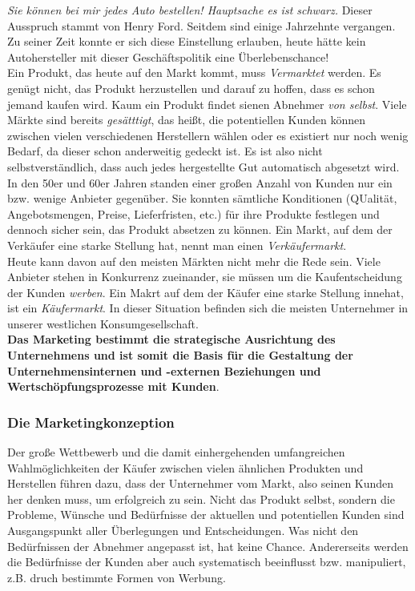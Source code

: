 \documentclass[a4paper, 12pt]{report}
\begin{document}
\begin{multicols}{2}
\emph{Sie können bei mir jedes Auto bestellen! Hauptsache es ist schwarz.}
Dieser Ausspruch stammt von Henry Ford. Seitdem sind einige Jahrzehnte
vergangen. Zu seiner Zeit konnte er sich diese Einstellung erlauben, heute
hätte kein Autohersteller mit dieser Geschäftspolitik eine Überlebenschance! \\

Ein Produkt, das heute auf den Markt kommt, muss \emph{Vermarktet} werden. Es
genügt nicht, das Produkt herzustellen und darauf zu hoffen, dass es schon
jemand kaufen wird. Kaum ein Produkt findet sienen Abnehmer \emph{von selbst}.
Viele Märkte sind bereits \emph{gesätttigt}, das heißt, die potentiellen Kunden
können zwischen vielen verschiedenen Herstellern wählen oder es existiert nur
noch wenig Bedarf, da dieser schon anderweitig gedeckt ist. Es ist also nicht
selbstverständlich, dass auch jedes hergestellte Gut automatisch abgesetzt
wird. \\

In den 50er und 60er Jahren standen einer großen Anzahl von Kunden nur ein bzw.
wenige Anbieter gegenüber. Sie konnten sämtliche Konditionen (QUalität,
Angebotsmengen, Preise, Lieferfristen, etc.) für ihre Produkte festlegen und
dennoch sicher sein, das Produkt absetzen zu können. Ein Markt, auf dem der
Verkäufer eine starke Stellung hat, nennt man einen \emph{Verkäufermarkt}. \\

Heute kann davon auf den meisten Märkten nicht mehr die Rede sein. Viele
Anbieter stehen in Konkurrenz zueinander, sie müssen um die Kaufentscheidung der
Kunden \emph{werben}. Ein Makrt auf dem der Käufer eine starke Stellung innehat,
ist ein \emph{Käufermarkt}. In dieser Situation befinden sich die meisten
Unternehmer in unserer westlichen Konsumgesellschaft. \\

\textbf{Das Marketing bestimmt die strategische Ausrichtung des Unternehmens und
ist somit die Basis für die Gestaltung der Unternehmensinternen und -externen
Beziehungen und Wertschöpfungsprozesse mit Kunden}. \\

\subsubsection{Die Marketingkonzeption}

Der große Wettbewerb und die damit einhergehenden umfangreichen
Wahlmöglichkeiten der Käufer zwischen vielen ähnlichen Produkten und Herstellen
führen dazu, dass der Unternehmer vom Markt, also seinen Kunden her denken muss,
um erfolgreich zu sein. Nicht das Produkt selbst, sondern die Probleme, Wünsche
und Bedürfnisse der aktuellen und potentiellen Kunden sind Ausgangspunkt aller
Überlegungen und Entscheidungen. Was nicht den Bedürfnissen der Abnehmer
angepasst ist, hat keine Chance. Andererseits werden die Bedürfnisse der Kunden
aber auch systematisch beeinflusst bzw. manipuliert, z.B. druch bestimmte Formen
von Werbung. \\


\end{multicols}
\end{document}
